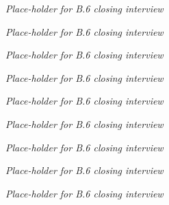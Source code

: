 \newpage
\Huge
\textit{Place-holder for B.6 closing interview}
\normalsize

\newpage
\Huge
\textit{Place-holder for B.6 closing interview}
\normalsize

\newpage
\Huge
\textit{Place-holder for B.6 closing interview}
\normalsize

\newpage
\Huge
\textit{Place-holder for B.6 closing interview}
\normalsize

\newpage
\Huge
\textit{Place-holder for B.6 closing interview}
\normalsize

\newpage
\Huge
\textit{Place-holder for B.6 closing interview}
\normalsize

\newpage
\Huge
\textit{Place-holder for B.6 closing interview}
\normalsize

\newpage
\Huge
\textit{Place-holder for B.6 closing interview}
\normalsize

\newpage
\Huge
\textit{Place-holder for B.6 closing interview}
\normalsize






